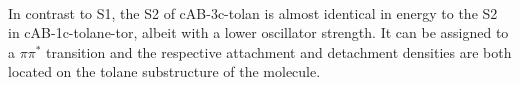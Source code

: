 % 
% 
\\
In contrast to S1, the S2 of cAB-3c-tolan is almost identical in energy to the S2 in cAB-1c-tolane-tor, albeit with a lower oscillator strength. 
It can be assigned to a $\pi\pi^*$ transition and the respective attachment and detachment densities are both located on the tolane substructure of the molecule.\\
%
